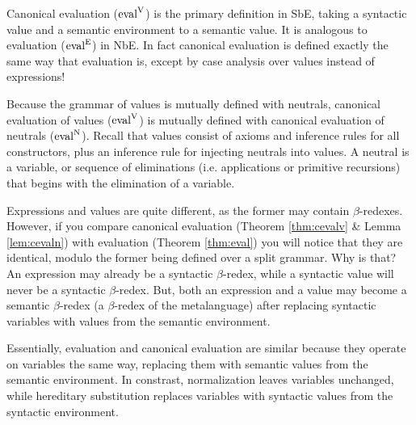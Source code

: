 \documentclass{llncs}
\newcommand{\refthm}[1]{Theorem \ref{thm:#1}}
\newcommand{\reflem}[1]{Lemma \ref{lem:#1}}
\def\eval{\fun{eval}^\con{E}}
\def\cevalv{\fun{eval}^\con{V}}
\def\cevaln{\fun{eval}^\con{N}}
\newcommand{\con}[1]{\textmd{#1}}
\newcommand{\fun}[1]{\textmd{#1}}
\begin{document}
Canonical evaluation ($\cevalv$) is the primary definition in SbE, taking a
syntactic value and a semantic environment to a semantic value. It is
analogous to evaluation ($\eval$) in NbE. In fact canonical evaluation
is defined exactly the same way that evaluation is, except by case
analysis over values instead of expressions!

Because the grammar of values is mutually defined with neutrals,
canonical evaluation of values ($\cevalv$) is mutually defined with canonical
evaluation of neutrals ($\cevaln$). Recall that values consist of axioms and
inference rules for all constructors, plus an inference rule for
injecting neutrals into values. A neutral is a variable, or 
sequence of eliminations (i.e. applications or primitive recursions)
that begins with the elimination of a variable.

Expressions and values are quite different, as the former
may contain $\beta$-redexes. However, if you compare
canonical evaluation (\refthm{cevalv} \& \reflem{cevaln}) with
evaluation (\refthm{eval}) you will notice that they are identical,
modulo the former being defined over a split grammar. Why is that?
An expression may already be a syntactic $\beta$-redex, while a
syntactic value will never be a syntactic $\beta$-redex. But, both an
expression and a value may become a semantic $\beta$-redex (a
$\beta$-redex of the metalanguage) after replacing syntactic variables
with values from the semantic environment. 

Essentially, evaluation and canonical evaluation are similar because
they operate on variables the same way, replacing them with semantic
values from the semantic environment. In constrast,
normalization leaves variables unchanged, while hereditary
substitution replaces variables with syntactic values from the
syntactic environment. 
\end{document}
